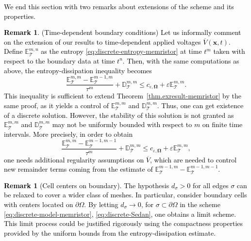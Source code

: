 \documentclass[10pt,a4paper, final]{article}
\newcommand{\reviewerOne}[1]{\textcolor{black}{#1}}
\theoremstyle{definition}								%
\newtheorem{remark}[theorem]{Remark}
\numberwithin{equation}{section}
\numberwithin{figure}{section}
\numberwithin{theorem}{section}
\begin{document}
\reviewerOne{We end this section with two remarks about extensions of the scheme and its properties.
\begin{remark}\label{rem.time_varying}(Time-dependent boundary conditions)
    Let us informally comment on the extension of our results to time-dependent applied voltages $\overline{V}(\mathbf{x},t)$.
    Define $\mathbb{E}_\mathcal{T}^{m,n}$ as the entropy \eqref{eq:discrete-entropy-memristor} at time $t^m$ taken with respect to the boundary data at time $t^n$.
    Then, with the same computations as above, the entropy-dissipation inequality becomes
    \begin{equation*}
        \frac{\mathbb{E}_{\mathcal{T}}^{m,m} - \mathbb{E}_{\mathcal{T}}^{m-1,m}}{\tau^m} + \mathbb{D}_{\mathcal{T}}^{m,m} \leq c_{\varepsilon, \mathbf{\Omega}} + \varepsilon \mathbb{E}_\mathcal{T}^{m,m}.
    \end{equation*}
    This inequality is sufficient to extend Theorem~\ref{thm.exresult-memristor} by the same proof, as it yields a control of $\mathbb{E}_{\mathcal{T}}^{m,m}$ and $\mathbb{D}_{\mathcal{T}}^{m,m}$. Thus, one can get existence of a discrete solution. However, the stability of this solution is not granted as $\mathbb{E}_{\mathcal{T}}^{m,m}$ and $\mathbb{D}_{\mathcal{T}}^{m,m}$ may not be uniformly bounded with respect to $m$ on finite time intervals. More precisely, in order to obtain
    \begin{equation*}
        \frac{\mathbb{E}_{\mathcal{T}}^{m,m} - \mathbb{E}_{\mathcal{T}}^{m-1,m-1}}{\tau^m} + \mathbb{D}_{\mathcal{T}}^{m,m} \leq c_{\varepsilon, \mathbf{\Omega}} + \varepsilon \mathbb{E}_\mathcal{T}^{m,m},
    \end{equation*}
one needs additional regularity assumptions on $\overline{V}$, which are needed to control new remainder terms coming from the estimate of $\mathbb{E}_{\mathcal{T}}^{m-1,m} - \mathbb{E}_{\mathcal{T}}^{m-1,m-1}$.
\end{remark}
\begin{remark}[Cell centers on boundary]\label{rem.centeronboundary}
    The hypothesis $d_\sigma>0$ for all edges $\sigma$ can be relaxed to cover a wider class of meshes.
    In particular, consider boundary cells with centers located on $\partial\Omega$.
    By letting $d_\sigma \rightarrow 0$, for $\sigma\subset\partial\Omega$ in the scheme \eqref{eq:discrete-model-memristor}, \eqref{eq:discrete-Sedan}, one obtains a limit scheme.
    This limit process could be justified rigorously using the compactness properties provided by the uniform bounds from the entropy-dissipation estimate.

\end{remark}}
\end{document}
